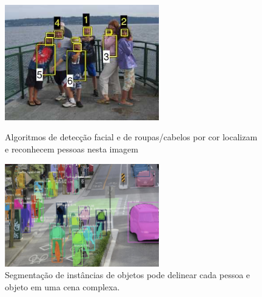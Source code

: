 \begin{figure}
    \centering
    \begin{minipage}[b]{0.49\textwidth}
      \centering
      \includegraphics[width=0.6\textwidth]{figures/detectacao_de_faces_exemplo.JPG}
      \caption{Algoritmos de detecção facial e de roupas/cabelos por cor localizam e reconhecem pessoas nesta imagem \cite{computer_vision_richard}}
      \label{fig:imagem_a}
    \end{minipage}
    \hfill
    \begin{minipage}[b]{0.49\textwidth}
      \centering
      \includegraphics[width=0.6\textwidth]{figures/semantic_intance.JPG}
        \caption{Segmentação de instâncias de objetos pode delinear cada pessoa e objeto em uma cena complexa. 
        \cite{instance_segmentation}}
      \label{fig:imagem_b}
    \end{minipage}
  \end{figure}
  

